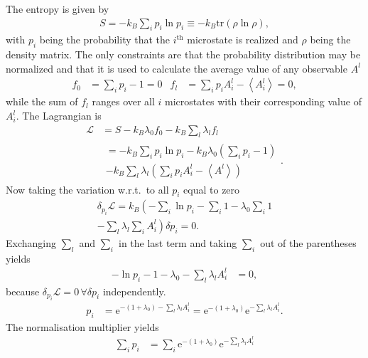 \documentclass[a4paper,10pt]{article}
\numberwithin{equation}{section}
\begin{document}
\begin{multicols}{2}
The entropy is given by
\begin{align} 
  \boxed{S = -k_B\sum_{i}^{}p_i \ln p_i\equiv -k_B\text{tr}\left(\rho \ln \rho \right)}
,\end{align} 
with $p_i$ being the probability that the $i^{\text{th}}$ microstate is realized and $\rho $ being the density matrix.
The only constraints are that the probability distribution may be normalized and that it is used to calculate the average value of any observable $A^l$ 
\begin{align} 
  f_0 &= \sum_{i}^{}p_i-1=0 & f_l &= \sum_{i}^{}p_iA^l_i-\left\langle A^l_i\right\rangle =0
,\end{align} 
while the sum of $f_l$ ranges over all $i$ microstates with their corresponding value of $A_i^l$.
The Lagrangian is
\begin{align} 
  \mathcal{L} &= S - k_B\lambda _0f_0 - k_B\sum_{l}^{}\lambda _lf_l\\
              &\begin{multlined}
              = -k_B\sum_{i}^{}p_i\ln p_i - k_B\lambda _0\left(\sum_{i}^{}p_i-1\right) \\- k_B\sum_{l}^{}\lambda _l\left(\sum_{i}^{}p_iA_i^l-\left\langle A^l\right\rangle \right)
              \end{multlined}
.\end{align} 
Now taking the variation w.r.t.\ to all $p_i$ equal to zero
\begin{multline}
  \delta _{p_i}\mathcal{L} = k_B\left(-\sum_{i}^{}\ln p_i - \sum_{i}^{}1 - \lambda _0\sum_{i}^{}1 \right.\\ -\left.\sum_{l}^{}\lambda _l \sum_{i}^{}A_i^l\right)\delta p_i=0
.\end{multline}
Exchanging $\sum_{l}^{}$ and $\sum_{i}^{}$ in the last term and taking $\sum_{i}^{}$ out of the parentheses yields
\begin{align} 
  -\ln p_i - 1 - \lambda _0 - \sum_{l}^{}\lambda _lA^l_i &= 0
,\end{align} 
because $\delta _{p_i}\mathcal{L}=0\,\forall \delta p_i$ independently.
\begin{align} 
  p_i &= \text{e}^{-(1 + \lambda _0) - \sum_{l}^{}\lambda _lA_i^l} = \text{e}^{-(1+\lambda _0)}\text{e}^{-\sum_{l}^{}\lambda _lA_i^l}
.\end{align} 
The normalisation multiplier yields
\begin{align} 
  \sum_{i}^{}p_i &= \sum_{i}^{}\text{e}^{-(1+\lambda _0)}\text{e}^{-\sum_{l}^{}\lambda _lA_i^l}\\

\end{align}
\end{multicols}
\end{document}
